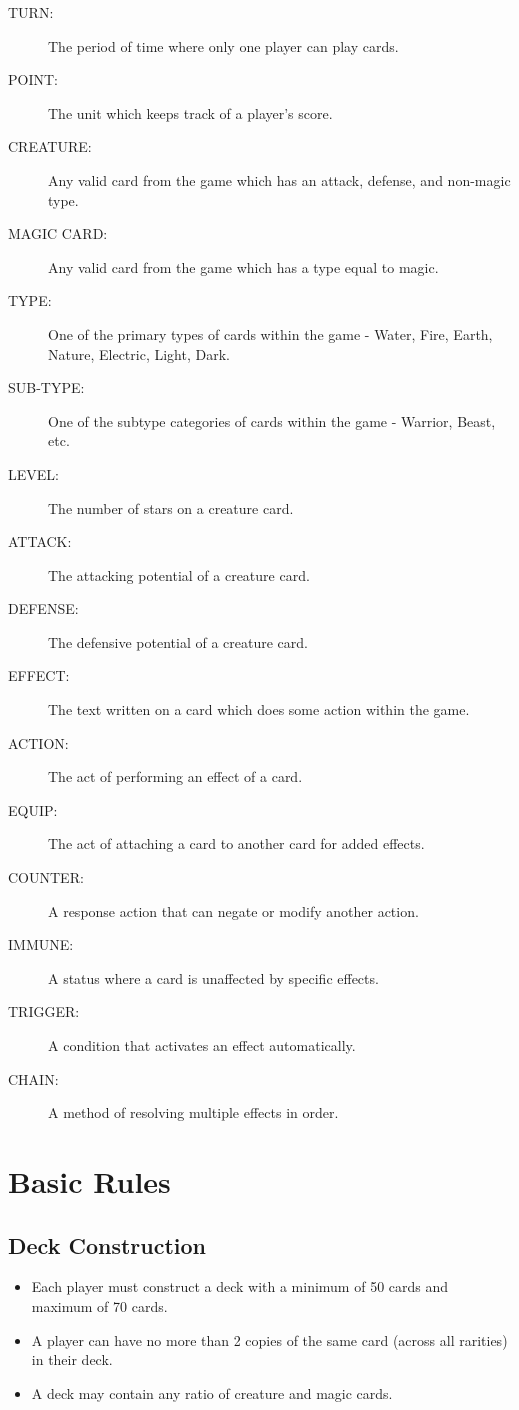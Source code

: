 \begin{description}
    \item[TURN:] The period of time where only one player can play cards.
    \item[POINT:] The unit which keeps track of a player's score.
    \item[CREATURE:] Any valid card from the game which has an attack, defense, and non-magic type.
    \item[MAGIC CARD:] Any valid card from the game which has a type equal to magic.
    \item[TYPE:] One of the primary types of cards within the game - Water, Fire, Earth, Nature, Electric, Light, Dark.
    \item[SUB-TYPE:] One of the subtype categories of cards within the game - Warrior, Beast, etc.
    \item[LEVEL:] The number of stars on a creature card.
    \item[ATTACK:] The attacking potential of a creature card.
    \item[DEFENSE:] The defensive potential of a creature card.
    \item[EFFECT:] The text written on a card which does some action within the game.
    \item[ACTION:] The act of performing an effect of a card.
    \item[EQUIP:] The act of attaching a card to another card for added effects.
    \item[COUNTER:] A response action that can negate or modify another action.
    \item[IMMUNE:] A status where a card is unaffected by specific effects.
    \item[TRIGGER:] A condition that activates an effect automatically.
    \item[CHAIN:] A method of resolving multiple effects in order.
\end{description}











\section{Basic Rules}

\subsection{Deck Construction}
\begin{itemize}
    \item Each player must construct a deck with a minimum of 50 cards and maximum of 70 cards.
    \item A player can have no more than 2 copies of the same card (across all rarities) in their deck.
    \item A deck may contain any ratio of creature and magic cards.
\end{itemize}





